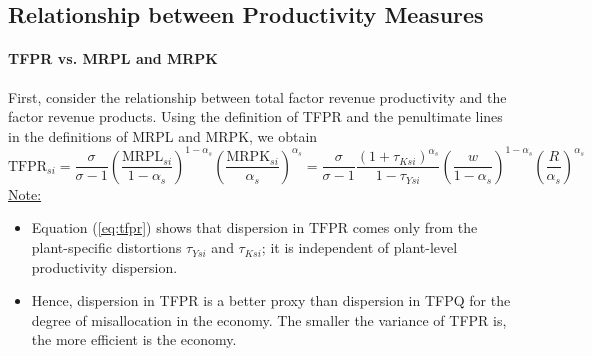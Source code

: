 \documentclass[12pt]{article}
\begin{document}
	

\subsection{Relationship between Productivity Measures}

\paragraph{TFPR vs. MRPL and MRPK  \\ [6pt]}

First, consider the relationship between total factor revenue productivity and the factor revenue products. Using the definition of TFPR and the penultimate lines in the definitions of MRPL and MRPK, we obtain
	\begin{equation} \label{eq:tfpr}
		\text{TFPR}_{si} = \frac{\sigma}{\sigma -1} \left(\frac{\text{MRPL}_{si}}{1-\alpha_s}\right)^{1-\alpha_s} \left(\frac{\text{MRPK}_{si}}{\alpha_s}\right)^{\alpha_s} = \frac{\sigma}{\sigma-1} \frac{(1+\tau_{Ksi})^{\alpha_s}}{1-\tau_{Ysi}} \left(\frac{w}{1-\alpha_s}\right)^{1-\alpha_s} \left(\frac{R}{\alpha_s}\right)^{\alpha_s}
	\end{equation}
\underline{Note:}
\begin{itemize}
		\item Equation (\ref{eq:tfpr}) shows that dispersion in $\text{TFPR}$ comes only from the plant-specific distortions $\tau_{Ysi}$ and $\tau_{Ksi}$; it is independent of plant-level productivity dispersion. 
	\item Hence, dispersion in TFPR is a better proxy than dispersion in TFPQ for the degree of misallocation in the economy. The smaller the variance of TFPR is, the more efficient is the economy.
\end{itemize}
\end{document}
